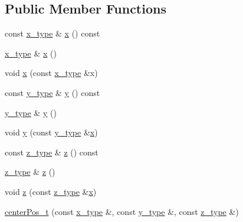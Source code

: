 \subsection*{Public Member Functions}
\begin{DoxyCompactItemize}
\item 
const \hyperlink{classcenterPos__t_ad9202ab9a64d0ac44ac212e2b8ad52f9}{x\-\_\-type} \& \hyperlink{classcenterPos__t_aed87cbea230ad34c4154ce268a729c61}{x} () const 
\item 
\hyperlink{classcenterPos__t_ad9202ab9a64d0ac44ac212e2b8ad52f9}{x\-\_\-type} \& \hyperlink{classcenterPos__t_af0cc4301b30b5e371f9a870332f57cee}{x} ()
\item 
void \hyperlink{classcenterPos__t_a96929b2d9933a718295f505986b7404a}{x} (const \hyperlink{classcenterPos__t_ad9202ab9a64d0ac44ac212e2b8ad52f9}{x\-\_\-type} \&x)
\item 
const \hyperlink{classcenterPos__t_a729ec04aac9d1066004b319cca2879fd}{y\-\_\-type} \& \hyperlink{classcenterPos__t_abdbdcbe58018d0aea3014ccc156beb7f}{y} () const 
\item 
\hyperlink{classcenterPos__t_a729ec04aac9d1066004b319cca2879fd}{y\-\_\-type} \& \hyperlink{classcenterPos__t_a2557e1f42e6e7a3d5e9a61dd549ca1da}{y} ()
\item 
void \hyperlink{classcenterPos__t_ad5fd4ab7ecf57c42dc5e9c1109bd2b42}{y} (const \hyperlink{classcenterPos__t_a729ec04aac9d1066004b319cca2879fd}{y\-\_\-type} \&\hyperlink{classcenterPos__t_aed87cbea230ad34c4154ce268a729c61}{x})
\item 
const \hyperlink{classcenterPos__t_a6c424433a912263b9c8644a89ad14082}{z\-\_\-type} \& \hyperlink{classcenterPos__t_acc523766223f841534ae7c497dac1282}{z} () const 
\item 
\hyperlink{classcenterPos__t_a6c424433a912263b9c8644a89ad14082}{z\-\_\-type} \& \hyperlink{classcenterPos__t_a8d413cf482c77b8798325895af33d2f1}{z} ()
\item 
void \hyperlink{classcenterPos__t_a4efe9adefd41d738075de58f1ad92cb1}{z} (const \hyperlink{classcenterPos__t_a6c424433a912263b9c8644a89ad14082}{z\-\_\-type} \&\hyperlink{classcenterPos__t_aed87cbea230ad34c4154ce268a729c61}{x})
\item 
\hyperlink{classcenterPos__t_a8ada28b759c2bf0cf3194e2fa1bd345e}{center\-Pos\-\_\-t} (const \hyperlink{classcenterPos__t_ad9202ab9a64d0ac44ac212e2b8ad52f9}{x\-\_\-type} \&, const \hyperlink{classcenterPos__t_a729ec04aac9d1066004b319cca2879fd}{y\-\_\-type} \&, const \hyperlink{classcenterPos__t_a6c424433a912263b9c8644a89ad14082}{z\-\_\-type} \&)

\end{DoxyCompactItemize}
